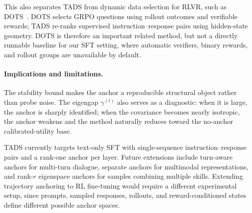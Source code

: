 This also separates \textsc{TADS} from dynamic data selection for
RLVR, such as DOTS~\cite{sun2025dots}. DOTS selects GRPO questions
using rollout outcomes and verifiable rewards; \textsc{TADS}
re-ranks supervised instruction--response pairs using hidden-state
geometry. DOTS is therefore an important related method, but not a
directly runnable baseline for our SFT setting, where automatic
verifiers, binary rewards, and rollout groups are unavailable by
default.

\paragraph{Implications and limitations.}
The stability bound makes the anchor a reproducible structural
object rather than probe noise. The eigengap $\gamma^{(t)}$ also
serves as a diagnostic: when it is large, the anchor is sharply
identified; when the covariance becomes nearly isotropic, the
anchor weakens and the method naturally reduces toward the
no-anchor calibrated-utility base.

\textsc{TADS} currently targets text-only SFT with single-sequence
instruction--response pairs and a rank-one anchor per layer. Future
extensions include turn-aware anchors for multi-turn dialogue,
separate anchors for multimodal representations, and rank-$r$
eigenspace anchors for samples combining multiple skills.
Extending trajectory anchoring to RL fine-tuning would require a
different experimental setup, since prompts, sampled responses,
rollouts, and reward-conditioned states define different possible
anchor spaces.
